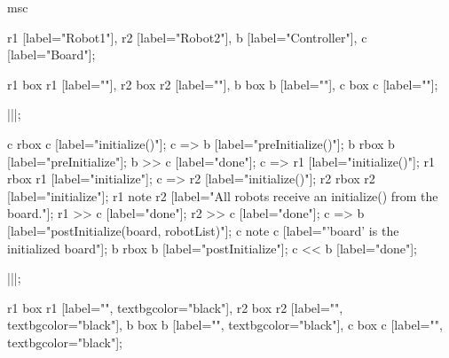 \begin{msc}
msc
{

r1 [label="Robot1"],
r2 [label="Robot2"],
b [label="Controller"],
c [label="Board"];

r1 box r1 [label=""],
r2 box r2 [label=""],
b box b [label=""],
c box c [label=""];

|||;

c rbox c [label="initialize()"];
c => b [label="preInitialize()"];
b rbox b [label="preInitialize"];
b >> c [label="done"];
c => r1 [label="initialize()"];
r1 rbox r1 [label="initialize"];
c => r2 [label="initialize()"];
r2 rbox r2 [label="initialize"];
r1 note r2 [label="All robots receive an initialize() from the board."];
r1 >> c [label="done"];
r2 >> c [label="done"];
c => b [label="postInitialize(board, robotList)"];
c note c [label="'board' is the initialized board"];
b rbox b [label="postInitialize"];
c << b [label="done"];

|||;

r1 box r1 [label="", textbgcolor="black"],
r2 box r2 [label="", textbgcolor="black"],
b box b [label="", textbgcolor="black"],
c box c [label="", textbgcolor="black"];

}
\end{msc}
